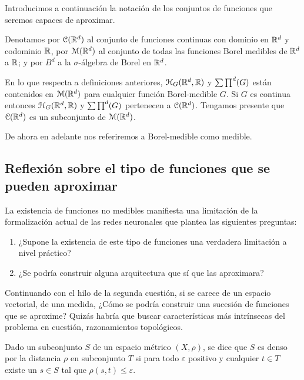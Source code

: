 Introducimos a continuación la notación de los conjuntos de funciones que seremos capaces de aproximar.  

Denotamos por  $\mathcal{C}(\mathbb{R}^d)$ al conjunto de funciones continuas con dominio en $\mathbb{R}^d$ y codominio $\mathbb{R}$,
por  $\mathcal{M}(\mathbb{R}^d)$ al conjunto de todas las funciones Borel medibles de $\mathbb{R}^d$ a $\mathbb{R}$; 
y por $B^d$ a la $\sigma$-álgebra de Borel en $\mathbb{R} ^d$. 

En lo que respecta a definiciones anteriores, $\mathcal{H}_G(\mathbb{R}^d,\mathbb{R})$ y $\sum \prod^d (G)$ están contenidos en
$\mathcal{M}(\mathbb{R}^d)$ para cualquier función Borel-medible $G$. Si $G$ es continua entonces 
$\mathcal{H}_G(\mathbb{R}^d,\mathbb{R})$ y $\sum \prod^d (G)$ pertenecen a $\mathcal{C}(\mathbb{R}^d)$. Tengamos presente que $\mathcal{C}(\mathbb{R}^d)$ es un subconjunto
de $\mathcal{M}(\mathbb{R}^d)$.  

De ahora en adelante nos referiremos a Borel-medible como medible. 
  

\subsection{ Reflexión sobre el tipo de funciones que se pueden aproximar}

La existencia de funciones no medibles manifiesta una limitación
de la formalización actual de las redes neuronales que plantea las siguientes 
preguntas: 
\begin{enumerate}
    \item ¿Supone la existencia de este tipo de funciones una verdadera limitación a nivel práctico?
    \item ¿Se podría construir alguna arquitectura que sí que las aproximara?
\end{enumerate}  

Continuando con el hilo de la segunda cuestión, si se carece de un espacio vectorial, 
de una medida,  ¿Cómo se podría construir una sucesión de funciones que se aproxime?
Quizás habría que buscar características más intrínsecas del problema en cuestión, 
razonamientos topológicos.

\begin{definicion} 
    \reversemarginpar 
    \setlength{\marginparwidth}{\smallMarginSize}
    \normalmarginpar

    Dado un subconjunto $S$ de un espacio métrico $(X, \rho)$, se dice que $S$ es denso por la distancia $\rho$
    en subconjunto $T$ si para todo $\varepsilon$ positivo y cualquier $t \in T$ existe un $s \in S$ tal 
    que $\rho(s,t) \leq \varepsilon$. 
\end{definicion}

